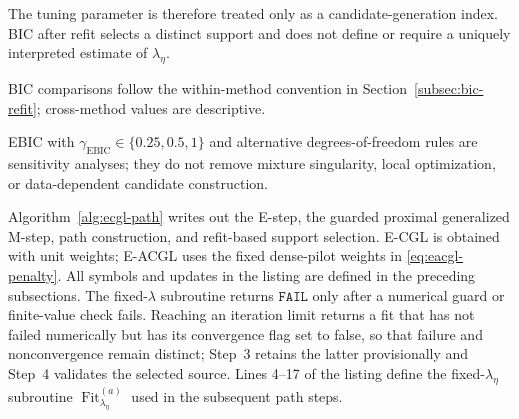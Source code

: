 \documentclass[preprint,12pt,authoryear]{elsarticle}
\begin{document}
The tuning parameter is therefore treated only as a candidate-generation
index. BIC after refit selects a distinct support and does not define or
require a uniquely interpreted estimate of $\lambda_\eta$.

BIC comparisons follow the within-method convention in
Section~\ref{subsec:bic-refit}; cross-method values are descriptive.

EBIC \citep{chen2008ebic} with $\gamma_{\mathrm{EBIC}}\in\{0.25,0.5,1\}$ and
alternative degrees-of-freedom rules are sensitivity analyses; they do not
remove mixture singularity, local optimization, or data-dependent candidate
construction.

Algorithm~\ref{alg:ecgl-path} writes out the E-step, the guarded proximal
generalized M-step, path construction, and refit-based support selection.
E-CGL is obtained with unit weights; E-ACGL uses the fixed dense-pilot weights
in \eqref{eq:eacgl-penalty}. All symbols and updates in the listing are defined
in the preceding subsections.
The fixed-$\lambda$ subroutine returns $\mathtt{FAIL}$ only after a numerical
guard or finite-value check fails. Reaching an iteration limit returns a fit
that has not failed numerically but has its convergence flag set to false, so
that failure and nonconvergence remain distinct; Step~3 retains the latter
provisionally and Step~4 validates the selected source.
Lines 4--17 of the listing define the fixed-$\lambda_\eta$ subroutine
$\operatorname{Fit}_{\lambda_\eta}^{(a)}$ used in the subsequent path steps.
\end{document}
